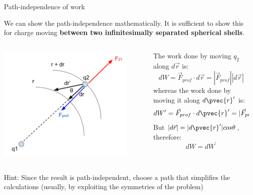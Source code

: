 \begin{frame}{Path-independence of work}

{\small
We can show the path-independence mathematically.
It is sufficient to show this for charge moving {\bf between two infinitesimally separated spherical shells}.
}
\vspace{0.3cm}

\begin{columns}
  \begin{column}{0.50\textwidth}
   \begin{center}
     \includegraphics[width=0.88\textwidth]{./images/schematics/work_2_like_charges_2_q1q2_step.png}\\
   \end{center}
  \end{column}
  \begin{column}{0.50\textwidth}
  {\small
     The work done by moving $q_2$ along $d\vec{r}$ is:
     \begin{equation*}
       dW = \vec{F}_{prof} \cdot d\vec{r} = |\vec{F}_{prof}| |d\vec{r}|
     \end{equation*}
     whereas the work done by moving it along $d\pvec{r}'$ is:
     \begin{equation*}
       dW^{\prime} = \vec{F}_{prof} \cdot d\pvec{r}' = |\vec{F}_{prof}| |d\pvec{r}'| cos\theta
     \end{equation*}
     But $|d\vec{r}| = |d\pvec{r}'| cos\theta$, therefore:
     \begin{equation*}
       dW = dW^{\prime}
     \end{equation*}
  }
  \end{column}
\end{columns}

\vspace{0.1cm}
{\small
Hint: Since the result is path-independent, choose a path that simplifies the calculations
(usually, by exploiting the symmetries of the problem)
}

\end{frame}

